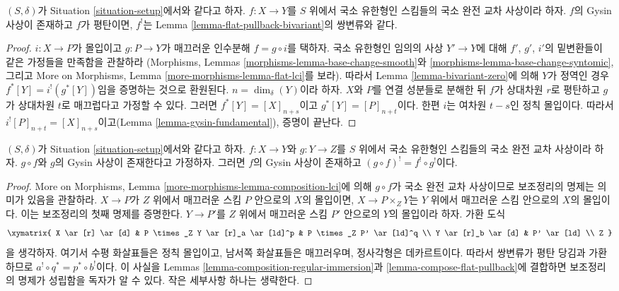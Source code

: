 \begin{lemma}
\label{lemma-lci-gysin-flat}
$(S, \delta)$가 Situation \ref{situation-setup}에서와 같다고 하자.
$f : X \to Y$를 $S$ 위에서 국소 유한형인 스킴들의 국소 완전 교차
사상이라 하자. $f$의 Gysin 사상이 존재하고 $f$가 평탄이면, $f^!$는
Lemma \ref{lemma-flat-pullback-bivariant}의 쌍변류와 같다.
\end{lemma}

\begin{proof}
$i : X \to P$가 몰입이고 $g : P \to Y$가 매끄러운 인수분해
$f = g \circ i$를 택하자. 국소 유한형인 임의의 사상 $Y' \to Y$에
대해 $f'$, $g'$, $i'$의 밑변환들이 같은 가정들을 만족함을 관찰하라
(Morphisms, Lemmas \ref{morphisms-lemma-base-change-smooth}와
\ref{morphisms-lemma-base-change-syntomic}, 그리고 More on Morphisms,
Lemma \ref{more-morphisms-lemma-flat-lci}를 보라). 따라서 Lemma
\ref{lemma-bivariant-zero}에 의해 $Y$가 정역인 경우
$f^*[Y] = i^!(g^*[Y])$임을 증명하는 것으로 환원된다.
$n = \dim_\delta(Y)$이라 하자. $X$와 $P$를 연결 성분들로 분해한 뒤
$f$가 상대차원 $r$로 평탄하고 $g$가 상대차원 $t$로 매끄럽다고
가정할 수 있다. 그러면 $f^*[Y] = [X]_{n + s}$이고
$g^*[Y] = [P]_{n + t}$이다. 한편 $i$는 여차원 $t - s$인 정칙
몰입이다. 따라서 $i^![P]_{n + t} = [X]_{n + s}$이고(Lemma
\ref{lemma-gysin-fundamental}), 증명이 끝난다.
\end{proof}

\begin{lemma}
\label{lemma-lci-gysin-composition}
$(S, \delta)$가 Situation \ref{situation-setup}에서와 같다고 하자.
$f : X \to Y$와 $g : Y \to Z$를 $S$ 위에서 국소 유한형인 스킴들의
국소 완전 교차 사상이라 하자. $g \circ f$와 $g$의 Gysin 사상이
존재한다고 가정하자. 그러면 $f$의 Gysin 사상이 존재하고
$(g \circ f)^! = f^! \circ g^!$이다.
\end{lemma}

\begin{proof}
More on Morphisms, Lemma
\ref{more-morphisms-lemma-composition-lci}에 의해 $g \circ f$가 국소
완전 교차 사상이므로 보조정리의 명제는 의미가 있음을 관찰하라.
$X \to P$가 $Z$ 위에서 매끄러운 스킴 $P$ 안으로의 $X$의 몰입이면,
$X \to P \times_Z Y$는 $Y$ 위에서 매끄러운 스킴 안으로의 $X$의
몰입이다. 이는 보조정리의 첫째 명제를 증명한다. $Y \to P'$를 $Z$
위에서 매끄러운 스킴 $P'$ 안으로의 $Y$의 몰입이라 하자. 가환 도식
$$
\xymatrix{
X \ar[r] \ar[d] &
P \times_Z Y \ar[r]_a \ar[ld]^p &
P \times_Z P' \ar[ld]^q \\
Y \ar[r]_b \ar[d] &
P' \ar[ld] \\
Z
}
$$
을 생각하자. 여기서 수평 화살표들은 정칙 몰입이고, 남서쪽
화살표들은 매끄러우며, 정사각형은 데카르트이다. 따라서 쌍변류가
평탄 당김과 가환하므로 $a^! \circ q^* = p^* \circ b^!$이다. 이 사실을
Lemmas \ref{lemma-composition-regular-immersion}과
\ref{lemma-compose-flat-pullback}에 결합하면 보조정리의 명제가
성립함을 독자가 알 수 있다. 작은 세부사항 하나는 생략한다.
\end{proof}

